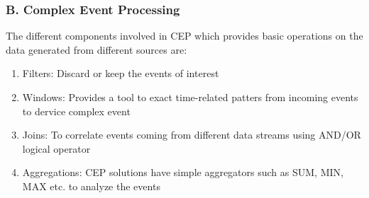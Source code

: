 \documentclass[runningheads]{llncs}
\begin{document}
\subsubsection{B. Complex Event Processing} The different components involved in CEP which provides basic operations on the data generated from different sources are:

\begin{enumerate}
\item Filters: Discard or keep the events of interest 
\item Windows: Provides a tool to exact time-related patters from incoming events to dervice complex event
\item Joins: To correlate events coming from different data streams using AND/OR logical operator
\item Aggregations: CEP solutions have simple aggregators such as SUM, MIN, MAX etc. to analyze the events
\end{enumerate}
\end{document}
